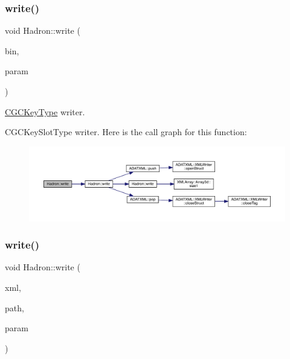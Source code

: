\subsubsection{\texorpdfstring{write()}{write()}\hspace{0.1cm}{\footnotesize\ttfamily [17/95]}}
{\footnotesize\ttfamily void Hadron\+::write (\begin{DoxyParamCaption}\item[{\mbox{\hyperlink{classADATIO_1_1BinaryWriter}{Binary\+Writer}} \&}]{bin,  }\item[{const \mbox{\hyperlink{structHadron_1_1KeyCGCIrrepMom__t}{Key\+C\+G\+C\+Irrep\+Mom\+\_\+t}} \&}]{param }\end{DoxyParamCaption})}



\mbox{\hyperlink{structHadron_1_1CGCKeyType}{C\+G\+C\+Key\+Type}} writer. 

C\+G\+C\+Key\+Slot\+Type writer. Here is the call graph for this function\+:
\nopagebreak
\begin{figure}[H]
\begin{center}
\leavevmode
\includegraphics[width=350pt]{d1/daf/namespaceHadron_ae48dac33aabaaf829859c63a77a06b8b_cgraph}
\end{center}
\end{figure}
\mbox{\label{namespaceHadron_a433908e65befd36f268196398b8469c7}} 
\subsubsection{\texorpdfstring{write()}{write()}\hspace{0.1cm}{\footnotesize\ttfamily [18/95]}}
{\footnotesize\ttfamily void Hadron\+::write (\begin{DoxyParamCaption}\item[{\mbox{\hyperlink{classADATXML_1_1XMLWriter}{X\+M\+L\+Writer}} \&}]{xml,  }\item[{const std\+::string \&}]{path,  }\item[{const \mbox{\hyperlink{structHadron_1_1MatrixSpinRep__t}{Matrix\+Spin\+Rep\+\_\+t}} \&}]{param }\end{DoxyParamCaption})}



